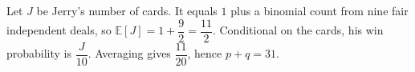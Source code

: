 Let $J$ be Jerry's number of cards. It equals $1$ plus a binomial count from nine fair independent deals, so $\mathbb E[J]=1+\dfrac{9}{2}=\dfrac{11}{2}$. Conditional on the cards, his win probability is $\dfrac{J}{10}$. Averaging gives $\dfrac{11}{20}$, hence $p+q=\boxed{31}$.
